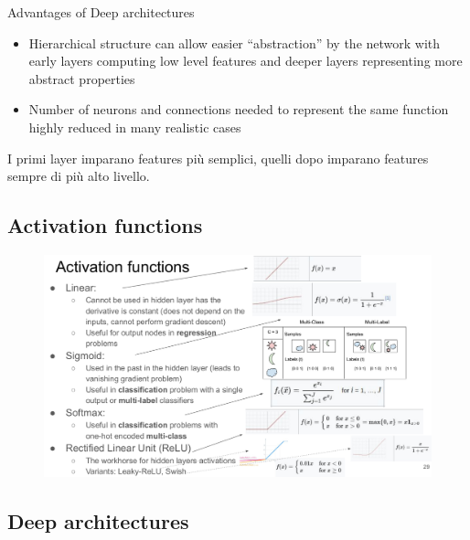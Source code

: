 Advantages of Deep architectures

\begin{itemize}
	\item Hierarchical structure can allow easier “abstraction” by the network with early layers computing low level features and deeper layers representing more abstract properties 
	\item Number of neurons and connections needed to represent the same function highly reduced in many realistic cases
\end{itemize}
I primi layer imparano features più semplici, quelli dopo imparano features sempre di più alto livello.

\subsection{Activation functions}
\begin{figure}[ht]
	\centering
	\includegraphics[width=1\linewidth]{figure_ml/activation_functions.png}
\end{figure}
\FloatBarrier

\newpage
\subsection{Deep architectures}

